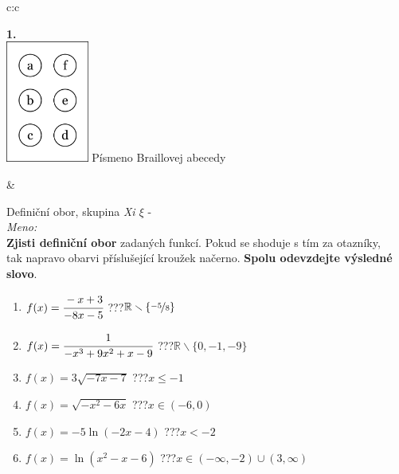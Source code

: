 \documentclass[10pt]{report}
\begin{document}
\begin{tabular}{c:c}
\begin{minipage}[c][99mm][t]{0.49\linewidth}
\begin{center}
\begin{minipage}{0.20\linewidth}
\begin{center}
{\Huge\bfseries 1.} \\[2mm]
\includegraphics[height=40mm]{../images/braille.png}
{\small Písmeno Braillovej abecedy}
\end{center}
\end{minipage}
\end{center}
\end{minipage}
&
\begin{minipage}[c][99mm][t]{0.49\linewidth}
\begin{center}
\vspace{7mm}
{\huge Definiční obor, skupina \textit{Xi $\xi$} -}\\[4.5mm]
\textit{Meno:}\phantom{xxxxxxxxxxxxxxxxxxxxxxxxxxxxxxxxxxxxxxxxxxxxxxxxxxxxxxxxxxxxxxxxx}\\[3.5mm]
\textbf{Zjisti definiční obor} zadaných funkcí. Pokud se shoduje s tím za otazníky,\\tak napravo obarvi příslušející kroužek načerno. \textbf{Spolu odevzdejte výsledné slovo}.\\[3mm]
\begin{minipage}{0.77\linewidth}
\begin{center}
\begin{varwidth}{\textwidth}
\begin{enumerate}
\normalsize
\item $f(x)=\cfrac{-x+3}{-8x-5}$\quad \dotfill\; ???\;\dotfill \quad $\mathbb{R}\smallsetminus\{\nicefrac{-5}{8}\}$
\item $f(x)=\cfrac{1}{-x^3+9x^2+x-9}$\quad \dotfill\; ???\;\dotfill \quad $\mathbb{R}\smallsetminus\{0,-1,-9\}$
\item $f(x)=3\sqrt{-7x-7}$\quad \dotfill\; ???\;\dotfill \quad $x\leq-1$
\item $f(x)=\sqrt{-x^2-6x}$\quad \dotfill\; ???\;\dotfill \quad $x\in(-6 , 0)$
\item $f(x)=-5\ln{(-2x-4)}$\quad \dotfill\; ???\;\dotfill \quad $x<-2$
\item $f(x)=\ln{(x^2-x-6)}$\quad \dotfill\; ???\;\dotfill \quad $x\in(-\infty , -2)\cup(3 , \infty)$

\end{enumerate}
\end{varwidth}
\end{center}
\end{minipage}
\end{center}
\end{minipage}
\end{tabular}
\end{document}
